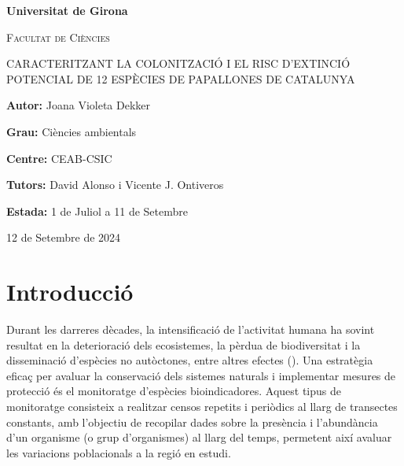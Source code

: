 \documentclass{article}
\begin{document}
\setlength{\parindent}{0pt}

\begin{titlepage}
    \centering
    {\bfseries\LARGE Universitat de Girona \par} \vspace{1cm}
    {\scshape\Large Facultat de Ciències \par}\vfill
    {\scshape\LARGE CARACTERITZANT LA COLONITZACIÓ I EL RISC D'EXTINCIÓ POTENCIAL DE 12 ESP\`ECIES DE PAPALLONES DE CATALUNYA\par} \vspace{2cm}

    {\large \textbf{Autor:} Joana Violeta Dekker \par}\vspace{0.1cm}
    {\large \textbf{Grau:} Ci\`encies ambientals \par}\vspace{0.1cm}
    {\large \textbf{Centre:} CEAB-CSIC \par}\vspace{0.1cm}
    {\large \textbf{Tutors: } David Alonso i Vicente J. Ontiveros\par}\vspace{0.1cm}
    {\large \textbf{Estada: } 1 de Juliol a 11 de Setembre \par}\vspace{1cm}
    {\large \textbf{} 12 de Setembre de 2024 \par}
\end{titlepage}

\newpage
\tableofcontents
\newpage
\section{Introducció}

Durant les darreres dècades, la intensificació de l'activitat humana ha sovint resultat en la deterioració dels ecosistemes, la pèrdua de biodiversitat i la disseminació d'espècies no aut\`octones, entre altres efectes (\cite{gotelli_2008}). Una estratègia eficaç per avaluar la conservació dels sistemes naturals i implementar mesures de protecció és el monitoratge d'espècies bioindicadores. Aquest tipus de monitoratge consisteix a realitzar censos repetits i periòdics al llarg de transectes constants, amb l'objectiu de recopilar dades sobre la pres\`encia i  l'abundància d'un organisme (o grup d'organismes) al llarg del temps, permetent així avaluar les variacions poblacionals a la regió en estudi.
\smallskip
\end{document}
